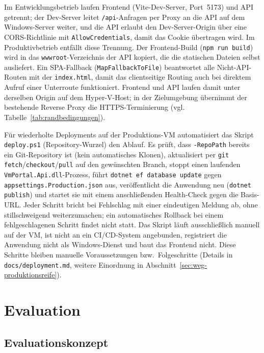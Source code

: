 \documentclass[12pt,a4paper]{article}
\begin{document}
Im Entwicklungsbetrieb laufen Frontend (Vite-Dev-Server, Port~5173) und API getrennt; der Dev-Server leitet \texttt{/api}-Anfragen per Proxy an die API auf dem Windows-Server weiter, und die API erlaubt den Dev-Server-Origin über eine CORS-Richtlinie mit \texttt{AllowCredentials}, damit das Cookie übertragen wird. Im Produktivbetrieb entfällt diese Trennung. Der Frontend-Build (\texttt{npm run build}) wird in das \texttt{wwwroot}-Verzeichnis der API kopiert, die die statischen Dateien selbst ausliefert. Ein SPA-Fallback (\texttt{MapFallbackToFile}) beantwortet alle Nicht-API-Routen mit der \texttt{index.html}, damit das clientseitige Routing auch bei direktem Aufruf einer Unterroute funktioniert. Frontend und API laufen damit unter derselben Origin auf dem Hyper-V-Host; in der Zielumgebung übernimmt der bestehende Reverse Proxy die HTTPS-Terminierung (vgl. Tabelle~\ref{tab:randbedingungen}).

Für wiederholte Deployments auf der Produktions-VM automatisiert das Skript \texttt{deploy.ps1} (Repository-Wurzel) den Ablauf. Es prüft, dass \texttt{-RepoPath} bereits ein Git-Repository ist (kein automatisches Klonen), aktualisiert per \texttt{git fetch}/\texttt{checkout}/\texttt{pull} auf den gewünschten Branch, stoppt einen laufenden \texttt{VmPortal.Api.dll}-Prozess, führt \texttt{dotnet ef database update} gegen \texttt{appsettings.Production.json} aus, veröffentlicht die Anwendung neu (\texttt{dotnet publish}) und startet sie mit einem anschließenden Health-Check gegen die Basis-URL. Jeder Schritt bricht bei Fehlschlag mit einer eindeutigen Meldung ab, ohne stillschweigend weiterzumachen; ein automatisches Rollback bei einem fehlgeschlagenen Schritt findet nicht statt. Das Skript läuft ausschließlich manuell auf der VM, ist nicht an ein CI/CD-System angebunden, registriert die Anwendung nicht als Windows-Dienst und baut das Frontend nicht. Diese Schritte bleiben manuelle Voraussetzungen bzw.\ Folgeschritte (Details in \texttt{docs/deployment.md}, weitere Einordnung in Abschnitt~\ref{sec:weg-produktionsreife}).

\newpage
\section{Evaluation}

\subsection{Evaluationskonzept}
\label{sec:evaluationskonzept}
\end{document}
